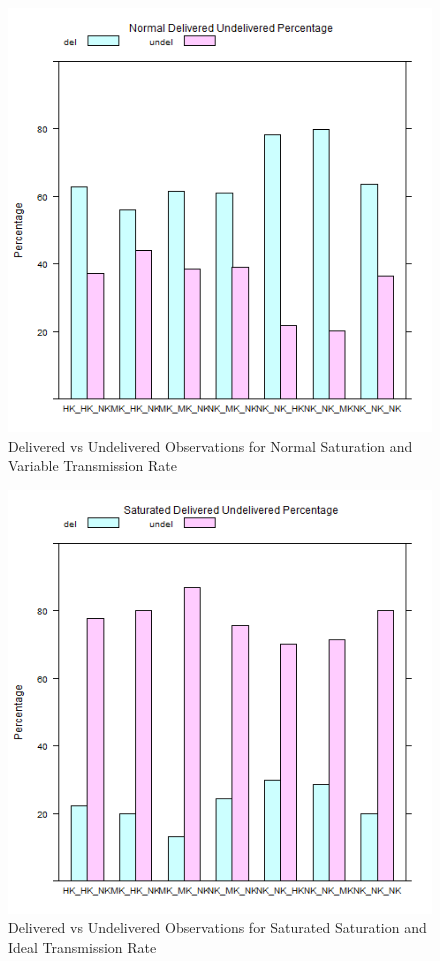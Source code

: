 	\begin{figure}[H]
	\centering
	\includegraphics[width=\textwidth]{Chap7/figures/plots/normal_variable/delvsundel_percent.png}
	\caption{Delivered vs Undelivered Observations for Normal Saturation and Variable Transmission Rate}
	\label{fig:sim:res:norm:variable:delundel}
	\end{figure}

	\begin{figure}[H]
	\centering
	\includegraphics[width=\textwidth]{Chap7/figures/plots/saturated_ideal/delvsundel_percent.png}
	\caption{Delivered vs Undelivered Observations for Saturated Saturation and Ideal Transmission Rate}
	\label{fig:sim:res:sat:ideal:delundel}
	\end{figure}


